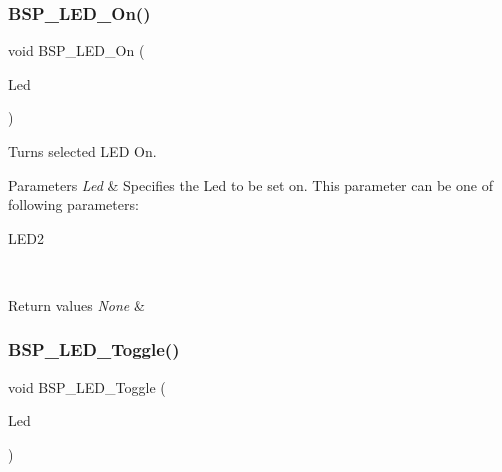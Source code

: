 \subsubsection{\texorpdfstring{B\+S\+P\+\_\+\+L\+E\+D\+\_\+\+On()}{BSP\_LED\_On()}}
{\footnotesize\ttfamily void B\+S\+P\+\_\+\+L\+E\+D\+\_\+\+On (\begin{DoxyParamCaption}\item[{\hyperlink{group__B-L072Z-LRWAN1__LOW__LEVEL__Exported__Types_gaa059704b7ca945eb9c1e7f2c3d03fecd}{Led\+\_\+\+Type\+Def}}]{Led }\end{DoxyParamCaption})}



Turns selected L\+ED On. 


\begin{DoxyParams}{Parameters}
{\em Led} & Specifies the Led to be set on. This parameter can be one of following parameters\+: \begin{DoxyItemize}
\item L\+E\+D2 \end{DoxyItemize}
\\
\hline
\end{DoxyParams}

\begin{DoxyRetVals}{Return values}
{\em None} & \\
\hline
\end{DoxyRetVals}
\mbox{\label{group__B-L072Z-LRWAN1__LOW__LEVEL__Exported__Functions_ga1b9eabba7d498f41d6f16587ec0f9732}} 
\subsubsection{\texorpdfstring{B\+S\+P\+\_\+\+L\+E\+D\+\_\+\+Toggle()}{BSP\_LED\_Toggle()}}
{\footnotesize\ttfamily void B\+S\+P\+\_\+\+L\+E\+D\+\_\+\+Toggle (\begin{DoxyParamCaption}\item[{\hyperlink{group__B-L072Z-LRWAN1__LOW__LEVEL__Exported__Types_gaa059704b7ca945eb9c1e7f2c3d03fecd}{Led\+\_\+\+Type\+Def}}]{Led }\end{DoxyParamCaption})}



